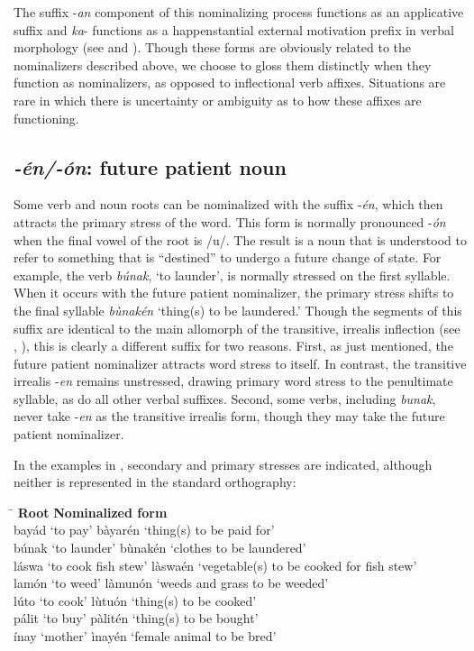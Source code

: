 The suffix -\textit{an} component of this nominalizing process functions as an applicative suffix and \textit{ka}{}- functions as a happenstantial external motivation prefix in verbal morphology (see   and ). Though these forms are obviously related to the nominalizers described above, we choose to gloss them distinctly when they function as nominalizers, as opposed to inflectional verb affixes. Situations are rare in which there is uncertainty or ambiguity as to how these affixes are functioning.


\subsection{\textit{-én/-ón}: future patient noun}
\label{sec:en}

Some verb and noun roots can be nominalized with the suffix -\textit{én}, which then attracts the primary stress of the word. This form is normally pronounced -\textit{ón} when the final vowel of the root is /u/. The result is a noun that is understood to refer to something that is “destined” to undergo a future change of state. For example, the verb \textit{búnak}, ‘to launder’, is normally stressed on the first syllable. When it occurs with the future patient nominalizer, the primary stress shifts to the final syllable \textit{bùnakén} ‘thing(s) to be laundered.’ Though the segments of this suffix are identical to the main allomorph of the transitive, irrealis inflection (see , ), this is clearly a different suffix for two reasons. First, as just mentioned, the future patient nominalizer attracts word stress to itself. In contrast, the transitive irrealis -\textit{en} remains unstressed, drawing primary word stress to the penultimate syllable, as do all other verbal suffixes. Second, some verbs, including \textit{bunak}, never take -\textit{en} as the transitive irrealis form, though they may take the future patient nominalizer.

In the examples in , secondary and primary stresses are indicated, although neither is represented in the standard orthography:

\ea
\label{ex:paidfor}
\begin{tabbing}
\hspace{4cm} \= \kill
\textbf{Root} \>  \textbf{Nominalized form} \\
bayád ‘to pay’ \> bàyarén ‘thing(s) to be paid for’ \\
búnak ‘to launder’ \> bùnakén ‘clothes to be laundered’ \\
láswa ‘to cook fish stew’ \> làswaén ‘vegetable(s) to be cooked for fish stew’ \\
lamón ‘to weed’ \>  làmunón ‘weeds and grass to be weeded’ \\
lúto ‘to cook’ \> lùtuón ‘thing(s) to be cooked’ \\
pálit ‘to buy’ \> pàlitén ‘thing(s) to be bought’ \\
ínay ‘mother’ \> ìnayén ‘female animal to be bred’
\end{tabbing}
\z

